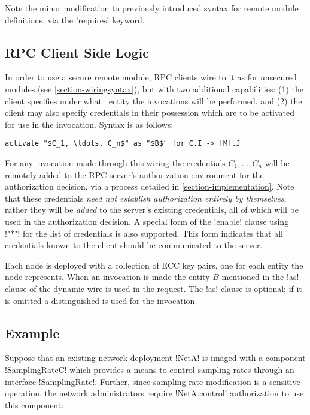 Note the minor modification to previously introduced syntax for remote module definitions, via
the !requires! keyword.

\subsection{RPC Client Side Logic}
\label{section-rpc-client-side}

In order to use a secure remote module, RPC clients wire to it as for unsecured modules (see
\autoref{section-wiringsyntax}), but with two additional capabilities: (1) the client specifies
under what \RT\ entity the invocations will be performed, and (2) the client may also specify
credentials in their possession which are to be activated for use in the invocation. Syntax is
as follows:
\begin{lstlisting}[mathescape=true]
activate "$C_1, \ldots, C_n$" as "$B$" for C.I -> [M].J
\end{lstlisting}
For any invocation made through this wiring the credentials $C_1, \ldots, C_n$ will be remotely
added to the RPC server's authorization environment for the authorization decision, via a
process detailed in \autoref{section-implementation}. Note that these credentials \emph{need not
  establish authorization entirely by themselves}, rather they will be \emph{added} to the
server's existing credentials, all of which will be used in the authorization decision. A
special form of the !enable! clause using !"*"! for the list of credentials is also supported.
This form indicates that all credentials known to the client should be communicated to the
server.

Each node is deployed with a collection of ECC key pairs, one for each entity the node
represents. When an invocation is made the entity $B$ mentioned in the !as! clause of the
dynamic wire is used in the request. The !as! clause is optional; if it is omitted a
distinguished  is used for the invocation.

\subsection{Example}
\label{section-security-example}

Suppose that an existing network deployment !NetA! is imaged with a component !SamplingRateC!
which provides a means to control sampling rates through an interface !SamplingRate!. Further,
since sampling rate modification is a sensitive operation, the network administrators require
!NetA.control! authorization to use this component:

